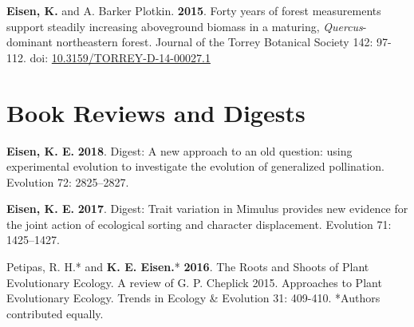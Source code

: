 \documentclass[letterpaper,11pt]{article}
\begin{document}
\begin{etaremune}
\item \textbf{Eisen, K.} and A. Barker Plotkin. \textbf{2015}. Forty years of forest measurements support steadily increasing aboveground biomass in a maturing, \textit{Quercus}-dominant northeastern forest. Journal of the Torrey Botanical Society 142: 97-112. doi:  \href{https://doi.org/10.3159/TORREY-D-14-00027.1} {10.3159/TORREY-D-14-00027.1}
\end{etaremune}

\section{Book Reviews and Digests}
\begin{etaremune}
\item \textbf{Eisen, K. E.} \textbf{2018}. Digest: A new approach to an old question: using experimental evolution to investigate the evolution of generalized pollination. Evolution 72: 2825–2827.\\
\item \textbf{Eisen, K. E.} \textbf{2017}. Digest: Trait variation in Mimulus provides new evidence for the joint action of ecological sorting and character displacement. Evolution 71: 1425–1427.\\
\item Petipas, R. H.* and \textbf{K. E. Eisen.}* \textbf{2016}. The Roots and Shoots of Plant Evolutionary Ecology. A review of G. P. Cheplick 2015. Approaches to Plant Evolutionary Ecology. Trends in Ecology \& Evolution 31: 409-410. *Authors contributed equally.\\
\end{etaremune}
\end{document}

